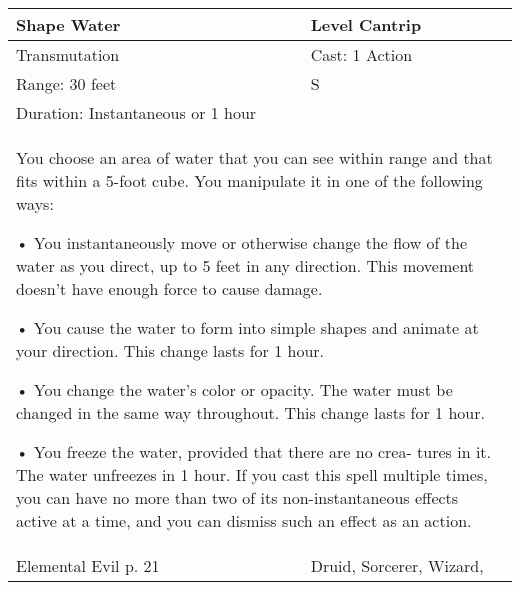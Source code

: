\documentclass[11pt]{report}
\begin{document}
\begin{table}[H]
	\begin{tabular}{||p{6cm}|p{6cm}||}
		\hline\hline
		\bf{Shape Water} & Level Cantrip\\ \hline
		Transmutation & Cast: 1 Action\\ \hline
		Range: 30 feet & S\\ \hline
		Duration: Instantaneous or 1 hour & \\ \hline
		\multicolumn{2}{||p{12cm}||}{You choose an area of water that you can see within range and that fits within a 5-foot cube. 
You manipulate it in one of the following ways:

• You instantaneously move or otherwise change the flow of the water as you direct, up to 5 feet in any direction. This movement doesn’t have enough force to cause damage.

• You cause the water to form into simple shapes and animate at your direction. This change lasts for 1 hour.

• You change the water’s color or opacity. The water must be changed in the same way throughout. This change lasts for 1 hour.

• You freeze the water, provided that there are no crea- tures in it. The water unfreezes in 1 hour.
If you cast this spell multiple times, you can have no more than two of its non-instantaneous effects active at a time, and you can dismiss such an effect as an action.}\\ \hline
Elemental Evil p. 21 & Druid, Sorcerer, Wizard, \\ \hline\hline
	\end{tabular}
\end{table}
\end{document}
